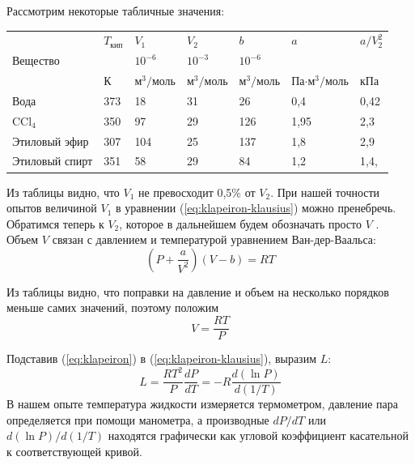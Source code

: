 \documentclass[12pt]{article}
\begin{document}
Рассмотрим некоторые табличные значения:
\begin{table}[H]
	\centering
	\begin{tabular}{|l|l|l|l|l|l|l|}
		\hline
		& $T_{\text{кип}}$ & $V_1$      & $V_2$      & $b$        & $a$                 & $a/V_2^2$ \\
		Вещество       &                  & $10^{-6}$  & $10^{-3}$  & $10^{-6}$  &                     &           \\
		& К                & м$^3/$моль & м$^3/$моль & м$^3/$моль & Па$\cdot$м$^3/$моль & кПа       \\ \hline
		Вода           & 373              & 18         & 31         & 26         & 0,4                 & 0,42      \\ \hline
		CCl$_4$        & 350              & 97         & 29         & 126        & 1,95                & 2,3       \\ \hline
		Этиловый эфир  & 307              & 104        & 25         & 137        & 1,8                 & 2,9       \\ \hline
		Этиловый спирт & 351              & 58         & 29         & 84         & 1,2                 & 1,4,      \\ \hline
	\end{tabular}
\end{table}

Из таблицы видно, что $V_1$ не превосходит 0,5\% от $V_2$. При нашей точности опытов величиной $V_1$ в уравнении (\ref{eq:klapeiron-klausius}) можно пренебречь.
Обратимся теперь к $V_2$, которое в дальнейшем будем обозначать
просто $V$ . Объем $V$ связан с давлением и температурой уравнением Ван-дер-Ваальса:
\begin{equation}
	\left( P + \frac{a}{V^2} \right)(V-b) = RT
\end{equation}

Из таблицы видно, что поправки на давление и объем на несколько порядков меньше самих значений, поэтому положим
\begin{equation}
	V = \frac{RT}{P}
	\label{eq:klapeiron}
\end{equation}

Подставив (\ref{eq:klapeiron}) в (\ref{eq:klapeiron-klausius}),
выразим $L$:
\begin{equation}
	L = \frac{RT^2}{P}\frac{dP}{dT} = -R\frac{d(\ln P)}{d(1/T)}
	\label{eq:main}
\end{equation}
В нашем опыте температура жидкости измеряется термометром, давление пара определяется при помощи манометра,
а производные $dP/dT$ или $d(\ln P)/d(1/T)$ находятся графически как угловой коэффициент касательной к соответствующей кривой.
\end{document}
